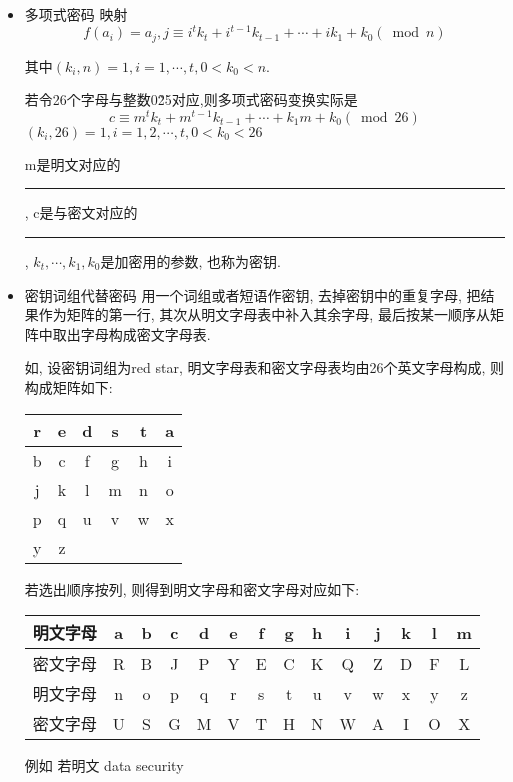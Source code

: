 \documentclass[UTF8]{ctexart}
\newcommand\hl{\bgroup\markoverwith
  {\textcolor{yellow}{\rule[-.5ex]{2pt}{2.5ex}}}\ULon}
\begin{document}
\begin{itemize}
        \item 多项式密码
        映射
        $$f(a_i)=a_j, j\equiv i^tk_t + i^{t-1}k_{t-1} + \cdots + ik_1 + k_0(\bmod n)$$

        其中$(k_i, n)=1, i=1,\cdots, t, 0<k_0<n$.

        若令26个字母与整数0\~{25}对应,则多项式密码变换实际是
        $$c\equiv m^tk_t + m^{t-1}k_{t-1} + \cdots + k_1m + k_0(\bmod 26)$$
        $(k_i, 26)=1, i=1, 2, \cdots, t, 0<k_0<26$

        m是明文对应的\hl{明文数据}, c是与密文对应的\hl{密文数据}, $k_t, \cdots, k_1, k_0$是加密用的参数, 也称为密钥.

        \item 密钥词组代替密码
        用一个词组或者短语作密钥, 去掉密钥中的重复字母, 把结果作为矩阵的第一行, 其次从明文字母表中补入其余字母, 最后按某一顺序从矩阵中取出字母构成密文字母表.

        如, 设密钥词组为red star, 明文字母表和密文字母表均由26个英文字母构成, 则构成矩阵如下:

        \begin{tabular}{|c|c|c|c|c|c|}
            \hline
            r& e& d& s& t& a\\
            \hline
            b& c& f& g& h& i\\
            \hline
            j& k& l& m& n& o\\
            \hline
            p& q& u& v& w& x\\
            \hline
            y& z&  &  &  &\\
            \hline
        \end{tabular}

        若选出顺序按列, 则得到明文字母和密文字母对应如下:

        \begin{tabular}{|c|c|c|c|c|c|c|c|c|c|c|c|c|c|}
            \hline
            明文字母& a& b& c& d& e& f& g& h& i& j& k& l& m\\
            \hline
            密文字母& R& B& J& P& Y& E& C& K& Q& Z& D& F& L\\
            \hline
            \hline
            明文字母& n& o& p& q& r& s& t& u& v& w& x& y& z\\
            \hline
            密文字母& U& S& G& M& V& T& H& N& W& A& I& O& X\\
            \hline
        \end{tabular}

        例如 若明文 data security


\end{itemize}
\end{document}
